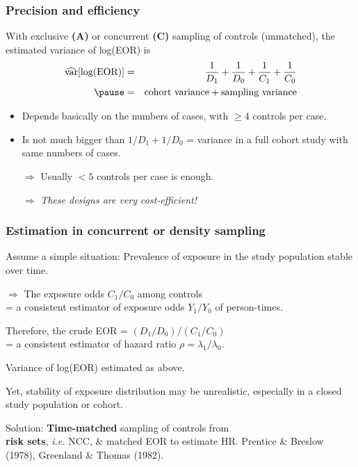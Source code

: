 \documentclass[12pt,dvipsnames,t,handout%
,aspectratio=169%
]{beamer}
\newcommand{\bes}{\begin{eqnarray*}}
\newcommand{\ees}{\end{eqnarray*}}
\begin{document}
\begin{frame}
\frametitle{Precision and efficiency}

With exclusive {\bf (A)} or concurrent {\bf (C)} sampling 
of controls (unmatched), the estimated variance of log(EOR) is \pause
\bes
 \widehat{\text{var}}\text{[log(EOR)]} 
  & = & \frac{1}{D_1} + \frac{1}{D_0} 
      + \frac{1}{C_1} + \frac{1}{C_0} \\
\pause
 & = & \text{cohort variance} + \text{sampling variance}
\ees 
\pause
\begin{itemize}
\item Depends basically on the numbers of cases, with  
$\geq 4$ controls per case.
\pause
\medskip
\item Is not much bigger than $1/D_1 + 1/D_0$ = variance in a full cohort study with   
 same numbers of cases.
 \pause
 \medskip
\item[$\Rightarrow$] Usually $< 5$ controls per case is enough.
 \pause\medskip
\item
[$\Rightarrow$] {\it These designs are very cost-efficient!}
\end{itemize}
\end{frame} 


\begin{frame}
\frametitle{Estimation in concurrent or density sampling}

\pause
\bi
\item Assume a simple situation: 
Prevalence of exposure %
in the study population stable over time. %
\pause
\medskip
\item[$\Rightarrow$] The exposure odds $C_1/C_0$ among controls \\
 = a consistent estimator of exposure odds $Y_1/Y_0$ of person-times.
\pause
\medskip
\item
Therefore, the crude EOR = $(D_1/D_0)/(C_1/C_0)$ \\ 
= a consistent estimator of
 {hazard ratio}  $\rho = \lambda_1/\lambda_0$.
\pause
\medskip
\item
Variance of log(EOR) estimated as above.
 \pause
\medskip
\item
Yet, stability of exposure distribution may be unrealistic,
especially in a closed study population or cohort. 

\pause
\medskip
\item
Solution: \textbf{Time-matched} sampling of controls from \\
{\bf risk sets}, {\it i.e.} NCC, \& 
matched EOR to estimate HR.
\ei
 Prentice \& Breslow (1978), Greenland \& Thomas (1982).
\end{frame} 
\end{document}
